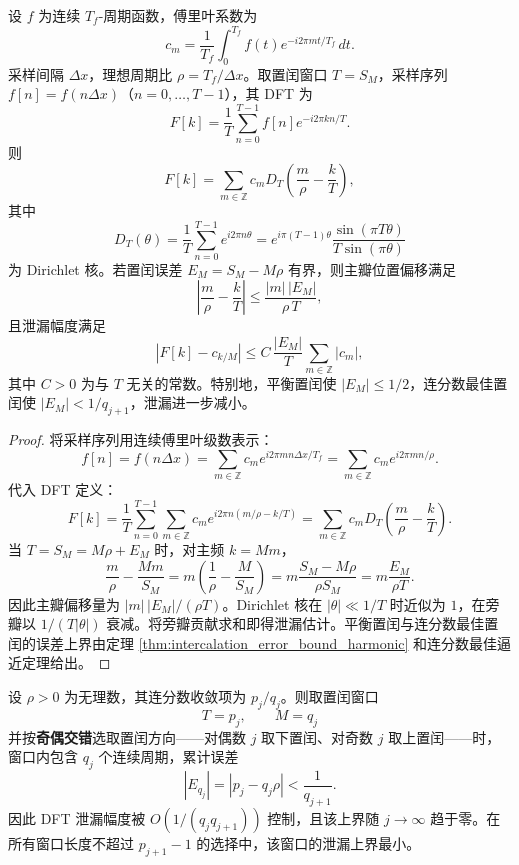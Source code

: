 \begin{theorem}\label{thm:intercalation_dft_leakage}
设 \(f\) 为连续 \(T_f\)-周期函数，傅里叶系数为
\[
c_m=\frac{1}{T_f}\int_0^{T_f} f(t)e^{-i2\pi mt/T_f}\,dt.
\]
采样间隔 \(\Delta x\)，理想周期比 \(\rho=T_f/\Delta x\)。取置闰窗口 \(T=S_M\)，采样序列 \(f[n]=f(n\Delta x)\)（\(n=0,\dots,T-1\)），其 DFT 为
\[
F[k]=\frac{1}{T}\sum_{n=0}^{T-1}f[n]e^{-i2\pi kn/T}.
\]
则
\[
F[k]=\sum_{m\in\mathbb{Z}} c_m D_T\!\left(\frac{m}{\rho}-\frac{k}{T}\right),
\]
其中
\[
D_T(\theta)=\frac{1}{T}\sum_{n=0}^{T-1}e^{i2\pi n\theta}
=e^{i\pi(T-1)\theta}\frac{\sin(\pi T\theta)}{T\sin(\pi\theta)}
\]
为 Dirichlet 核。若置闰误差 \(E_M=S_M-M\rho\) 有界，则主瓣位置偏移满足
\[
\left|\frac{m}{\rho}-\frac{k}{T}\right|
\le \frac{|m|\,|E_M|}{\rho\,T},
\]
且泄漏幅度满足
\[
|F[k]-c_{k/M}|
\le C\,\frac{|E_M|}{T}\sum_{m\in\mathbb{Z}}|c_m|,
\]
其中 \(C>0\) 为与 \(T\) 无关的常数。特别地，平衡置闰使 \(|E_M|\le 1/2\)，连分数最佳置闰使 \(|E_M|<1/q_{j+1}\)，泄漏进一步减小。
\end{theorem}

\begin{proof}
将采样序列用连续傅里叶级数表示：
\[
f[n]=f(n\Delta x)=\sum_{m\in\mathbb{Z}}c_m e^{i2\pi m n\Delta x/T_f}
=\sum_{m\in\mathbb{Z}}c_m e^{i2\pi m n/\rho}.
\]
代入 DFT 定义：
\[
F[k]=\frac{1}{T}\sum_{n=0}^{T-1}\sum_{m\in\mathbb{Z}}c_m
e^{i2\pi n(m/\rho-k/T)}
=\sum_{m\in\mathbb{Z}}c_m D_T\!\left(\frac{m}{\rho}-\frac{k}{T}\right).
\]
当 \(T=S_M=M\rho+E_M\) 时，对主频 \(k=Mm\)，
\[
\frac{m}{\rho}-\frac{Mm}{S_M}
=m\left(\frac{1}{\rho}-\frac{M}{S_M}\right)
=m\frac{S_M-M\rho}{\rho S_M}
=m\frac{E_M}{\rho T}.
\]
因此主瓣偏移量为 \(|m|\,|E_M|/(\rho T)\)。Dirichlet 核在 \(|\theta|\ll 1/T\) 时近似为 \(1\)，在旁瓣以 \(1/(T|\theta|)\) 衰减。将旁瓣贡献求和即得泄漏估计。平衡置闰与连分数最佳置闰的误差上界由定理 \ref{thm:intercalation_error_bound_harmonic} 和连分数最佳逼近定理给出。
\end{proof}

\begin{corollary}[连分数最佳置闰窗口]\label{cor:continued_fraction_intercalation}
设 \(\rho>0\) 为无理数，其连分数收敛项为 \(p_j/q_j\)。则取置闰窗口
\[
T=p_j,\qquad M=q_j
\]
并按\textbf{奇偶交错}选取置闰方向——对偶数 \(j\) 取下置闰、对奇数 \(j\) 取上置闰——时，窗口内包含 \(q_j\) 个连续周期，累计误差
\[
|E_{q_j}|=|p_j-q_j\rho|<\frac{1}{q_{j+1}}.
\]
因此 DFT 泄漏幅度被 \(O(1/(q_j q_{j+1}))\) 控制，且该上界随 $j\to\infty$ 趋于零。在所有窗口长度不超过 $p_{j+1}-1$ 的选择中，该窗口的泄漏上界最小。
\end{corollary}

